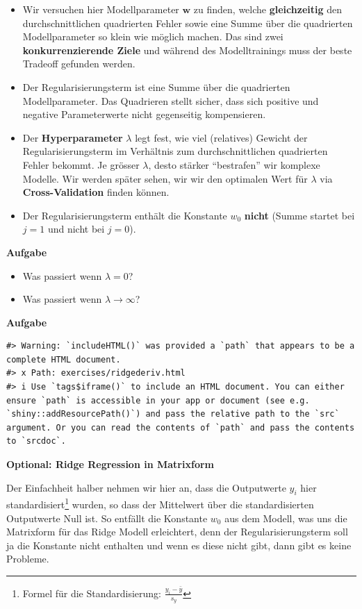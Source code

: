 \documentclass[
]{book}
\providecommand{\tightlist}{%
  \setlength{\itemsep}{0pt}\setlength{\parskip}{0pt}}
\begin{document}
\begin{itemize}
\tightlist
\item
  Wir versuchen hier Modellparameter \(\mathbf{w}\) zu finden, welche \textbf{gleichzeitig} den durchschnittlichen quadrierten Fehler sowie eine Summe über die quadrierten Modellparameter so klein wie möglich machen. Das sind zwei \textbf{konkurrenzierende Ziele} und während des Modelltrainings muss der beste Tradeoff gefunden werden.
\item
  Der Regularisierungsterm ist eine Summe über die quadrierten Modellparameter. Das Quadrieren stellt sicher, dass sich positive und negative Parameterwerte nicht gegenseitig kompensieren.
\item
  Der \textbf{Hyperparameter} \(\lambda\) legt fest, wie viel (relatives) Gewicht der Regularisierungsterm im Verhältnis zum durchschnittlichen quadrierten Fehler bekommt. Je grösser \(\lambda\), desto stärker ``bestrafen'' wir komplexe Modelle. Wir werden später sehen, wir wir den optimalen Wert für \(\lambda\) via \textbf{Cross-Validation} finden können.
\item
  Der Regularisierungsterm enthält die Konstante \(w_0\) \textbf{nicht} (Summe startet bei \(j=1\) und nicht bei \(j=0\)).
\end{itemize}

\textbf{Aufgabe}

\begin{itemize}
\tightlist
\item
  Was passiert wenn \(\lambda=0\)?
\item
  Was passiert wenn \(\lambda \rightarrow \infty\)?
\end{itemize}

\textbf{Aufgabe}

\begin{verbatim}
#> Warning: `includeHTML()` was provided a `path` that appears to be a complete HTML document.
#> x Path: exercises/ridgederiv.html
#> i Use `tags$iframe()` to include an HTML document. You can either ensure `path` is accessible in your app or document (see e.g. `shiny::addResourcePath()`) and pass the relative path to the `src` argument. Or you can read the contents of `path` and pass the contents to `srcdoc`.
\end{verbatim}

\textbf{Optional: Ridge Regression in Matrixform}

Der Einfachheit halber nehmen wir hier an, dass die Outputwerte \(y_i\) hier standardisiert\footnote{Formel für die Standardisierung: \(\frac{y_i-\bar{y}}{s_y}\)} wurden, so dass der Mittelwert über die standardisierten Outputwerte Null ist. So entfällt die Konstante \(w_0\) aus dem Modell, was uns die Matrixform für das Ridge Modell erleichtert, denn der Regularisierungsterm soll ja die Konstante nicht enthalten und wenn es diese nicht gibt, dann gibt es keine Probleme.
\end{document}
